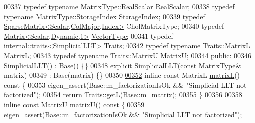 \begin{DoxyCode}
00337     \textcolor{keyword}{typedef} \textcolor{keyword}{typename} MatrixType::RealScalar RealScalar;
00338     \textcolor{keyword}{typedef} \textcolor{keyword}{typename} MatrixType::StorageIndex StorageIndex;
00339     \textcolor{keyword}{typedef} \hyperlink{group___sparse_core___module_class_eigen_1_1_sparse_matrix}{SparseMatrix<Scalar,ColMajor,Index>} CholMatrixType;
00340     \textcolor{keyword}{typedef} \hyperlink{group___core___module}{Matrix<Scalar,Dynamic,1>} \hyperlink{struct_vector_type}{VectorType};
00341     \textcolor{keyword}{typedef} \hyperlink{struct_eigen_1_1internal_1_1traits}{internal::traits<SimplicialLLT>} Traits;
00342     \textcolor{keyword}{typedef} \textcolor{keyword}{typename} Traits::MatrixL  MatrixL;
00343     \textcolor{keyword}{typedef} \textcolor{keyword}{typename} Traits::MatrixU  MatrixU;
00344 \textcolor{keyword}{public}:
\hyperlink{group___sparse_cholesky___module_ad25633e34d7c21b77fe05c873ffbe416}{00346}     \hyperlink{group___sparse_cholesky___module_ad25633e34d7c21b77fe05c873ffbe416}{SimplicialLLT}() : Base() \{\}
\hyperlink{group___sparse_cholesky___module_a342735f17d0306aa5581e91010091427}{00348}     \textcolor{keyword}{explicit} \hyperlink{group___sparse_cholesky___module_a342735f17d0306aa5581e91010091427}{SimplicialLLT}(\textcolor{keyword}{const} MatrixType& matrix)
00349         : Base(matrix) \{\}
00350 
\hyperlink{group___sparse_cholesky___module_ae2b24f8f6d62a8444193904988374299}{00352}     \textcolor{keyword}{inline} \textcolor{keyword}{const} MatrixL \hyperlink{group___sparse_cholesky___module_ae2b24f8f6d62a8444193904988374299}{matrixL}()\textcolor{keyword}{ const }\{
00353         eigen\_assert(Base::m\_factorizationIsOk && \textcolor{stringliteral}{"Simplicial LLT not factorized"});
00354         \textcolor{keywordflow}{return} Traits::getL(Base::m\_matrix);
00355     \}
00356 
\hyperlink{group___sparse_cholesky___module_a23522d6444c344ddb14e48dbfac128ed}{00358}     \textcolor{keyword}{inline} \textcolor{keyword}{const} MatrixU \hyperlink{group___sparse_cholesky___module_a23522d6444c344ddb14e48dbfac128ed}{matrixU}()\textcolor{keyword}{ const }\{
00359         eigen\_assert(Base::m\_factorizationIsOk && \textcolor{stringliteral}{"Simplicial LLT not factorized"});

\end{DoxyCode}
